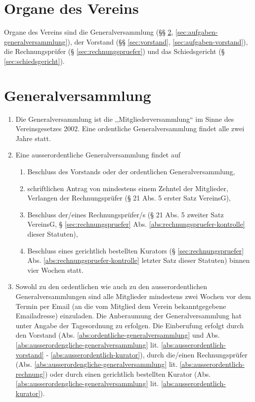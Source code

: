 \documentclass[a4paper,12pt]{article}
\newcommand{\funktionsperiode}{zwei Jahre }
\begin{document}
	\section{Organe des Vereins}
		\label{sec:organe}
		Organe des Vereins sind die Generalversammlung (§§ \ref{sec:generalversammlung}, \ref{sec:aufgaben-generalversammlung}), der Vorstand (§§ \ref{sec:vorstand}, \ref{sec:aufgaben-vorstand}), die Rechnungsprüfer (§ \ref{sec:rechnungspruefer}) und das Schiedsgericht (§ \ref{sec:schiedsgericht}).

	\section{Generalversammlung}
		\label{sec:generalversammlung}
		\begin{enumerate}
			\item Die Generalversammlung ist die ,,Mitgliederversammlung`` im Sinne des Vereinsgesetzes 2002. Eine ordentliche Generalversammlung findet alle \funktionsperiode statt.
			\label{abs:ordentliche-generalversammlung}
			\item Eine ausserordentliche Generalversammlung findet auf
			\label{abs:ausserordengliche-generalversammlung}
			\begin{enumerate}
				\item Beschluss des Vorstands oder der ordentlichen Generalversammlung,
				\label{abs:ausserordentlich-vorstand}
				\item schriftlichen Antrag von mindestens einem Zehntel der Mitglieder, Verlangen der Rechnungsprüfer (§ 21 Abs. 5 erster Satz VereinsG),
				\label{abs:ausserordentlich-mitglieder}
				\item Beschluss der/eines Rechnungsprüfer/s (§ 21 Abs. 5 zweiter Satz VereinsG, § \ref{sec:rechnungspruefer} Abs. \ref{abs:rechnungspruefer-kontrolle} dieser Statuten),
				\label{abs:ausserordentlich-rechnung}
				\item Beschluss eines gerichtlich bestellten Kurators (§ \ref{sec:rechnungspruefer} Abs. \ref{abs:rechnungspruefer-kontrolle} letzter Satz dieser Statuten) binnen vier Wochen statt.
				\label{abs:ausserordentlich-kurator}
			\end{enumerate}
			\item Sowohl zu den ordentlichen wie auch zu den ausserordentlichen Generalversammlungen sind alle Mitglieder mindestens zwei Wochen vor dem Termin per Email (an die vom Mitglied dem Verein bekanntgegebene Emailadresse) einzuladen. Die Anberaumung der Generalversammlung hat unter Angabe der Tagesordnung zu erfolgen. Die Einberufung erfolgt durch den Vorstand (Abs. \ref{abs:ordentliche-generalversammlung} und Abs. \ref{abs:ausserordengliche-generalversammlung}  lit. \ref{abs:ausserordentlich-vorstand} - \ref{abs:ausserordentlich-kurator}), durch die/einen Rechnungsprüfer (Abs. \ref{abs:ausserordengliche-generalversammlung} lit. \ref{abs:ausserordentlich-rechnung}) oder durch einen gerichtlich bestellten Kurator (Abs. \ref{abs:ausserordengliche-generalversammlung} lit. \ref{abs:ausserordentlich-kurator}).

\end{enumerate}
\end{document}
